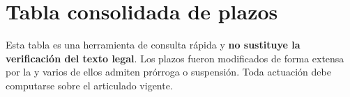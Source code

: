\chapter{Tabla consolidada de plazos}
\label{ap:plazos}

\begin{alerta}
Esta tabla es una herramienta de consulta rápida y \textbf{no sustituye la verificación
del texto legal}. Los plazos fueron modificados de forma extensa por la \Lreforma{} y
varios de ellos admiten prórroga o suspensión. Toda actuación debe computarse sobre el
articulado vigente.
\end{alerta}

